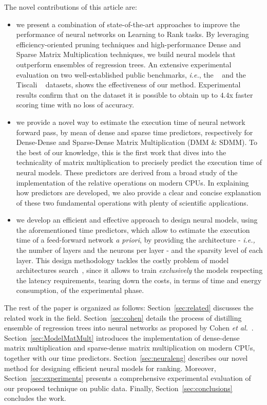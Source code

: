 The novel contributions of this article are:
\begin{itemize}
\item we present a combination of state-of-the-art approaches to improve the performance of neural networks on Learning to Rank tasks. By leveraging efficiency-oriented pruning techniques and high-performance Dense and Sparse Matrix Multiplication techniques, we build neural models that outperform ensembles of regression trees. An extensive experimental evaluation on two well-established public benchmarks, \textit{i.e.}, the \msn~\cite{DBLP:journals/corr/QinL13} and the Tiscali \istella~\cite{dato2016fast} datasets, shows the effectiveness of our method. Experimental results confirm that on the \msn dataset it is possible to obtain up to $4.4$x faster scoring time with no loss of accuracy.

\item we provide a novel way to estimate the execution time of neural network forward pass, by mean of dense and sparse time predictors, respectively for Dense-Dense and Sparse-Dense Matrix Multiplication (DMM \& SDMM). To the best of our knowledge, this is the first work that dives into the technicality of matrix multiplication to precisely predict the execution time of neural models.
These predictors are derived from a broad study of the implementation of the relative operations on modern CPUs. In explaining how predictors are developed, we also provide a clear and concise explanation of these two fundamental operations with plenty of scientific applications. 

\item we develop an efficient and effective approach to design neural models, using the aforementioned time predictors, which allow to estimate the execution time of a feed-forward network \textit{a priori}, by providing the architecture - \textit{i.e.,} the number of layers and the neurons per layer - and the sparsity level of each layer. This design methodology tackles the costly problem of model architectures search~\cite{strubell2019energy,patterson2021carbon}, since it allows to train \emph{exclusively} the models respecting the latency requirements, tearing down the costs, in terms of time and energy consumption, of the experimental phase.
\end{itemize}

The rest of the paper is organized as follows: Section~\ref{sec:related} discusses the related work in the field. Section~\ref{sec:cohen} details the process of distilling ensemble of regression trees into neural networks as proposed by Cohen \emph{et al.}~\cite{cohen2018universal}. Section~\ref{sec:ModelMatMult} introduces the implementation of dense-dense matrix multiplication and sparse-dense matrix multiplication on modern CPUs, together with our time predictors. Section~\ref{sec:neuraleng} describes our novel method for designing efficient neural models for ranking. Moreover, Section~\ref{sec:experiments} presents a comprehensive experimental evaluation of our proposed technique on public data. Finally, Section~\ref{sec:conclusions} concludes the work.

